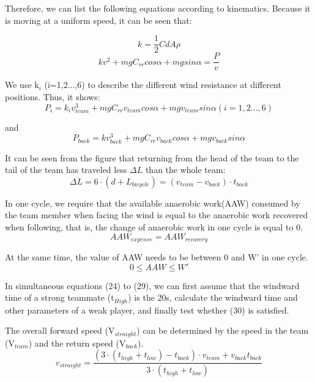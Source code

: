 \documentclass{mcmthesis}
\begin{document}
\par
Therefore, we can list the following equations according to kinematics.
Because it is moving at a uniform speed, it can be seen that:

\begin{equation}
k=\frac{1}{2}CdA\rho
\end{equation}
\begin{equation}
kv^2+mgC_{rr}cos\alpha+mgsin\alpha=\frac{P}{v}
\end{equation}
\par
We use k$_{i}$ (i=1,2...,6) to describe the different wind resistance at different positions. Thus, it shows:
\begin{equation}
P_{i}=k_{i}v_{team}^3+mgC_{rr}v_{team}cos\alpha+mgv_{team}sin\alpha(i=1,2...,6)
\end{equation}
\par
and
\begin{equation}
P_{back}=kv_{back}^3+mgC_{rr}v_{back}cos\alpha+mgv_{back}sin\alpha
\end{equation}
\par
It can be seen from the figure that returning from the head of the team to the tail of the team has traveled less $\Delta L$ than the whole team:
\begin{equation}
\Delta L=6\cdot (d+L_{bicycle})=(v_{team}-v_{back})\cdot t_{back}
\end{equation}
\par
In one cycle, we require that the available anaerobic work(AAW) consumed by the team member when facing the wind is equal to the anaerobic work recovered when following, that is, the change of anaerobic work in one cycle is equal to 0.
\begin{equation}
AAW_{expense}=AAW_{recovery}
\end{equation}
\par
At the same time, the value of AAW needs to be between 0 and W' in one cycle.
\begin{equation}
0\leq AAW\leq W'
\end{equation}
\par
In simultaneous equations (24) to (29), we can first assume that the windward time of a strong teammate (t$_{High}$) is the 20s, calculate the windward time and other parameters of a weak player, and finally test whether (30) is satisfied.
\par
The overall forward speed (V$_{straight}$) can be determined by the speed in the team (V$_{team}$) and the return speed (V$_{back}$).
\begin{equation}
v_{straight}=\frac{(3\cdot (t_{high}+t_{low})-t_{back})\cdot v_{team}+v_{back}t_{back}}{3\cdot (t_{high}+t_{low})}
\end{equation}
\end{document}
